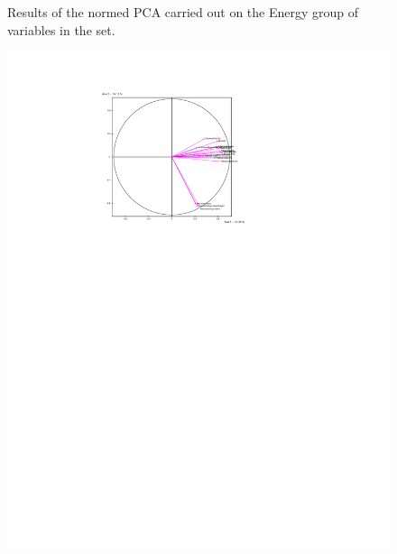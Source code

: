\documentclass[a4paper,10pt,twocolumn]{article}
\begin{document}
\begin{figure}[!ht]
\begin{center}
\caption{\footnotesize{Results of the normed PCA carried out on the Energy group of variables in the set.}\label{p3}}
\end{center}
\end{figure}

\begin{figure}[!ht]
\begin{center}
\includegraphics[width=16cm]{p4a.pdf}

\end{center}
\end{figure}
\end{document}
